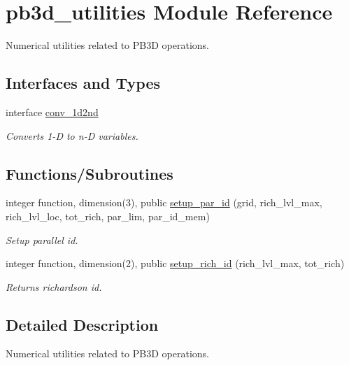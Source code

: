 \hypertarget{namespacepb3d__utilities}{}\section{pb3d\+\_\+utilities Module Reference}
\label{namespacepb3d__utilities}


Numerical utilities related to P\+B3D operations.  


\subsection*{Interfaces and Types}
\begin{DoxyCompactItemize}
\item 
interface \hyperlink{interfacepb3d__utilities_1_1conv__1d2nd}{conv\+\_\+1d2nd}
\begin{DoxyCompactList}\small\item\em Converts 1-\/D to n-\/D variables. \end{DoxyCompactList}\end{DoxyCompactItemize}
\subsection*{Functions/\+Subroutines}
\begin{DoxyCompactItemize}
\item 
integer function, dimension(3), public \hyperlink{namespacepb3d__utilities_ad047cd7b197aae821e2565933faccfa3}{setup\+\_\+par\+\_\+id} (grid, rich\+\_\+lvl\+\_\+max, rich\+\_\+lvl\+\_\+loc, tot\+\_\+rich, par\+\_\+lim, par\+\_\+id\+\_\+mem)
\begin{DoxyCompactList}\small\item\em Setup parallel id. \end{DoxyCompactList}\item 
integer function, dimension(2), public \hyperlink{namespacepb3d__utilities_ab461e756a85b3c6e8fa1ccaa6556c5b0}{setup\+\_\+rich\+\_\+id} (rich\+\_\+lvl\+\_\+max, tot\+\_\+rich)
\begin{DoxyCompactList}\small\item\em Returns richardson id. \end{DoxyCompactList}\end{DoxyCompactItemize}


\subsection{Detailed Description}
Numerical utilities related to P\+B3D operations. 

